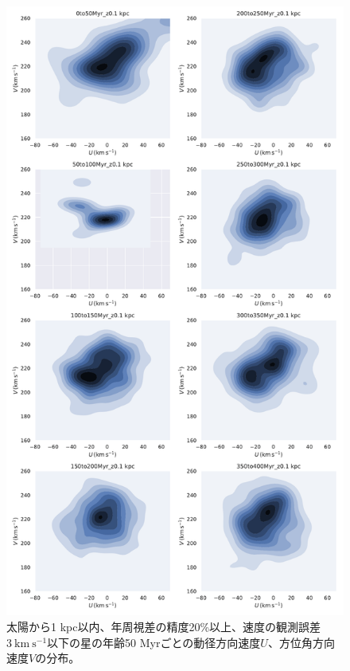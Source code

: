 \begin{figure}[htbp]
\begin{center}
	\includegraphics[width=12cm]{fig/UV/hist_seaborn_2_z0.1kpc.pdf}
	\caption{太陽から1 kpc以内、年周視差の精度20\%以上、速度の観測誤差$3\ \mathrm{km\ s^{-1}}$以下の星の年齢50 Myrごとの動径方向速度$U$、方位角方向速度$V$の分布。}
	\label{hist_seaborn_50Myr}
\end{center}
\end{figure}

